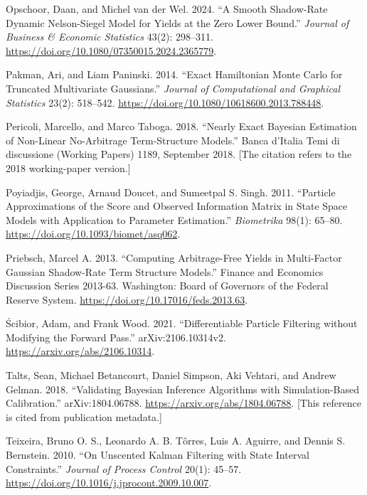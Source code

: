 \documentclass[11pt]{article}
\begin{document}
\begin{list}{}{\setlength{\leftmargin}{2em}\setlength{\itemindent}{-2em}\setlength{\itemsep}{2pt}\setlength{\parsep}{0pt}}
\item Opschoor, Daan, and Michel van der Wel. 2024. ``A Smooth Shadow-Rate Dynamic Nelson-Siegel Model for Yields at the Zero Lower Bound.'' \emph{Journal of Business \& Economic Statistics} 43(2): 298--311. \url{https://doi.org/10.1080/07350015.2024.2365779}.

\item Pakman, Ari, and Liam Paninski. 2014. ``Exact Hamiltonian Monte Carlo for Truncated Multivariate Gaussians.'' \emph{Journal of Computational and Graphical Statistics} 23(2): 518--542. \url{https://doi.org/10.1080/10618600.2013.788448}.

\item Pericoli, Marcello, and Marco Taboga. 2018. ``Nearly Exact Bayesian Estimation of Non-Linear No-Arbitrage Term-Structure Models.'' Banca d'Italia Temi di discussione (Working Papers) 1189, September 2018. [The citation refers to the 2018 working-paper version.]

\item Poyiadjis, George, Arnaud Doucet, and Sumeetpal S. Singh. 2011. ``Particle Approximations of the Score and Observed Information Matrix in State Space Models with Application to Parameter Estimation.'' \emph{Biometrika} 98(1): 65--80. \url{https://doi.org/10.1093/biomet/asq062}.

\item Priebsch, Marcel A. 2013. ``Computing Arbitrage-Free Yields in Multi-Factor Gaussian Shadow-Rate Term Structure Models.'' Finance and Economics Discussion Series 2013-63. Washington: Board of Governors of the Federal Reserve System. \url{https://doi.org/10.17016/feds.2013.63}.

\item \'Scibior, Adam, and Frank Wood. 2021. ``Differentiable Particle Filtering without Modifying the Forward Pass.'' arXiv:2106.10314v2. \url{https://arxiv.org/abs/2106.10314}.

\item Talts, Sean, Michael Betancourt, Daniel Simpson, Aki Vehtari, and Andrew Gelman. 2018. ``Validating Bayesian Inference Algorithms with Simulation-Based Calibration.'' arXiv:1804.06788. \url{https://arxiv.org/abs/1804.06788}. [This reference is cited from publication metadata.]

\item Teixeira, Bruno O. S., Leonardo A. B. T\^orres, Luis A. Aguirre, and Dennis S. Bernstein. 2010. ``On Unscented Kalman Filtering with State Interval Constraints.'' \emph{Journal of Process Control} 20(1): 45--57. \url{https://doi.org/10.1016/j.jprocont.2009.10.007}.


\end{list}
\end{document}

